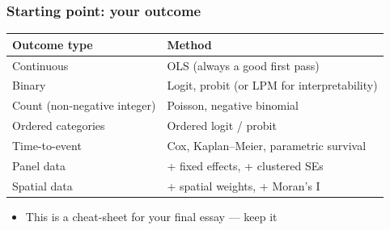 \begin{frame}
\frametitle{Starting point: your outcome}
\centering

\renewcommand{\arraystretch}{1.4}
\footnotesize
\begin{tabular}{p{3.5cm}p{6cm}}
\hline
\textbf{Outcome type} & \textbf{Method}\\
\hline
Continuous & OLS (always a good first pass)\\
Binary & Logit, probit (or LPM for interpretability)\\
Count (non-negative integer) & Poisson, negative binomial\\
Ordered categories & Ordered logit / probit\\
Time-to-event & Cox, Kaplan–Meier, parametric survival\\
Panel data & + fixed effects, + clustered SEs\\
Spatial data & + spatial weights, + Moran's I\\
\hline
\end{tabular}

\vspace{10pt}

\begin{itemize}
\item \footnotesize This is a cheat-sheet for your final essay --- keep it
\end{itemize}

\end{frame}

